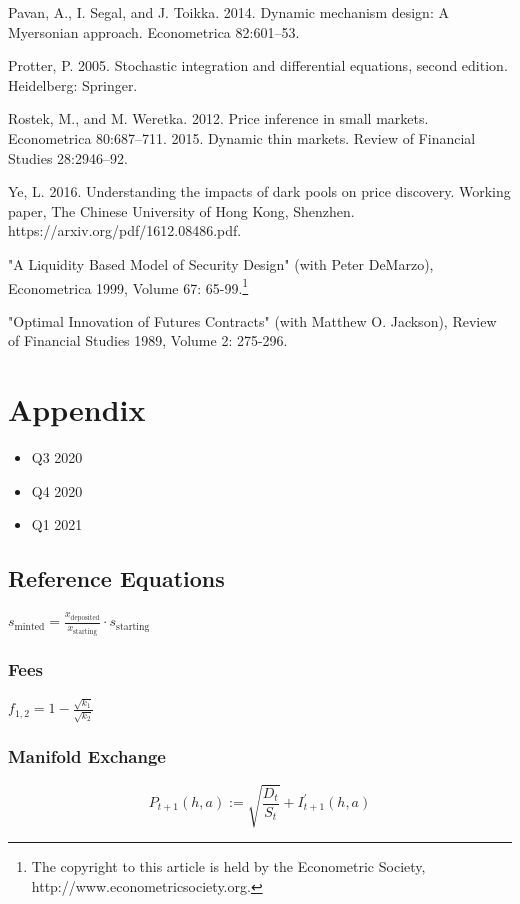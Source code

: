 {{{Pavan, A., I. Segal, and J. Toikka. 2014. Dynamic mechanism design: A Myersonian approach.
Econometrica 82:601–53.

Protter, P. 2005. Stochastic integration and diﬀerential equations, second edition. Heidelberg:
Springer.

Rostek, M., and M. Weretka. 2012. Price inference in small markets. Econometrica 80:687–711.
2015. Dynamic thin markets. Review of Financial Studies 28:2946–92.


Ye, L. 2016. Understanding the impacts of dark pools on price discovery. Working paper, The
Chinese University of Hong Kong, Shenzhen. https://arxiv.org/pdf/1612.08486.pdf.

"A Liquidity Based Model of Security Design" (with Peter DeMarzo), Econometrica 1999, Volume 67: 65-99.\footnote{The copyright to this article is held by the Econometric Society, http://www.econometricsociety.org.}

"Optimal Innovation of Futures Contracts" (with Matthew O. Jackson), Review of Financial Studies 
1989, Volume 2: 275-296.

\newpage

\chapter{Appendix}

\begin{itemize}
    \item Q3 2020
    \item Q4 2020
    \item Q1 2021
\end{itemize}



\section{Reference Equations}


$
s_{\text {minted}}=\frac{x_{\text {deposited}}}{x_{\text {starting}}} \cdot s_{\text {starting}}
$

\subsection{Fees}
$
f_{1,2}=1-\frac{\sqrt{k_{1}}}{\sqrt{k_{2}}}
$



\subsection{Manifold Exchange}
\begin{equation}
    P_{t+1}(h, a):=\sqrt{\frac{D_{t}}{S_{t}}}+I_{t+1}^{\prime}(h, a)
\end{equation}

}}}
